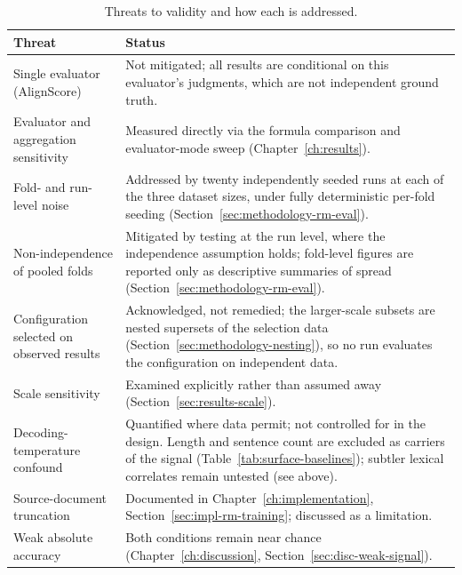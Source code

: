 \begin{table}[htbp]
\centering
\caption[Threats to validity]{Threats to validity and how each is addressed.}
\label{tab:threats-to-validity}
\begin{tabularx}{\textwidth}{lX}
\toprule
Threat & Status \\
\midrule
Single evaluator (AlignScore) & Not mitigated; all results are conditional on this
  evaluator's judgments, which are not independent ground truth. \\
Evaluator and aggregation sensitivity & Measured directly via the formula
  comparison and evaluator-mode sweep (Chapter~\ref{ch:results}). \\
Fold- and run-level noise & Addressed by twenty independently seeded runs at each
  of the three dataset sizes, under fully deterministic per-fold seeding
  (Section~\ref{sec:methodology-rm-eval}). \\
Non-independence of pooled folds & Mitigated by testing at the run level, where
  the independence assumption holds; fold-level figures are reported only as
  descriptive summaries of spread (Section~\ref{sec:methodology-rm-eval}). \\
Configuration selected on observed results & Acknowledged, not remedied; the
  larger-scale subsets are nested supersets of the selection data
  (Section~\ref{sec:methodology-nesting}), so no run evaluates the configuration
  on independent data. \\
Scale sensitivity & Examined explicitly rather than assumed away
  (Section~\ref{sec:results-scale}). \\
Decoding-temperature confound & Quantified where data permit; not controlled for
  in the design. Length and sentence count are excluded as carriers of the
  signal (Table~\ref{tab:surface-baselines}); subtler lexical correlates remain
  untested (see above). \\
Source-document truncation & Documented in Chapter~\ref{ch:implementation},
  Section~\ref{sec:impl-rm-training}; discussed as a limitation. \\
Weak absolute accuracy & Both conditions remain near chance
  (Chapter~\ref{ch:discussion}, Section~\ref{sec:disc-weak-signal}). \\
\bottomrule
\end{tabularx}
\end{table}
